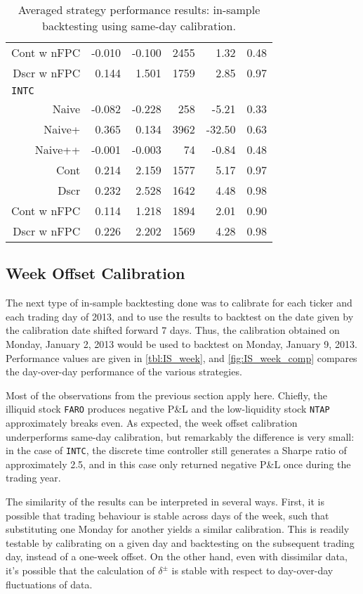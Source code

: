 \begin{table}
\begin{tabular}{@{} *{6}{r} @{}}
Cont w nFPC & -0.010 & -0.100 & 2455 & 1.32 & 0.48 \\ 
Dscr w nFPC & 0.144 & 1.501 & 1759 & 2.85 & 0.97 \\[2ex]
\multicolumn{6}{l}{\texttt{INTC}} \\
Naive & -0.082 & -0.228 & 258 & -5.21 & 0.33 \\ 
Naive+ & 0.365 & 0.134 & 3962 & -32.50 & 0.63 \\ 
Naive++ & -0.001 & -0.003 & 74 & -0.84 & 0.48 \\ 
Cont & 0.214 & 2.159 & 1577 & 5.17 & 0.97 \\ 
Dscr & 0.232 & 2.528 & 1642 & 4.48 & 0.98 \\ 
Cont w nFPC & 0.114 & 1.218 & 1894 & 2.01 & 0.90 \\ 
Dscr w nFPC &  0.226 & 2.202 & 1569 & 4.28 & 0.98 \\ 
\bottomrule
\end{tabular}
\caption[In-sample backtesting performance using same-day calibration]{Averaged strategy performance results: in-sample backtesting using same-day calibration.}
\label{tbl:IS_sameday}
\end{table}

\FloatBarrier
\subsection{Week Offset Calibration}
The next type of in-sample backtesting done was to calibrate for each ticker and each trading day of 2013, and to use the results to backtest on the date given by the calibration date shifted forward 7 days. Thus, the calibration obtained on Monday, January 2, 2013 would be used to backtest on Monday, January 9, 2013. Performance values are given in \autoref{tbl:IS_week}, and \autoref{fig:IS_week_comp} compares the day-over-day performance of the various strategies. 

Most of the observations from the previous section apply here. Chiefly, the illiquid stock \texttt{FARO} produces negative P\&L and the low-liquidity stock \texttt{NTAP} approximately breaks even. As expected, the week offset calibration underperforms same-day calibration, but remarkably the difference is very small: in the case of \texttt{INTC}, the discrete time controller still generates a Sharpe ratio of approximately 2.5, and in this case only returned negative P\&L once during the trading year. 

The similarity of the results can be interpreted in several ways. First, it is possible that trading behaviour is stable across days of the week, such that substituting one Monday for another yields a similar calibration. This is readily testable by calibrating on a given day and backtesting on the subsequent trading day, instead of a one-week offset. On the other hand, even with dissimilar data, it's possible that the calculation of $\delta^\pm$ is stable with respect to day-over-day fluctuations of data.

